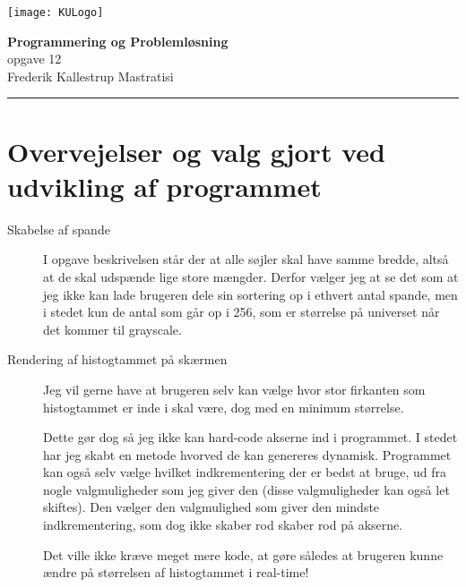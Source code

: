 \documentclass[12pt, a4paper, hidelinks]{article}
\begin{document}
\begin{minipage}[b]{1.0\linewidth}
\texttt{[image: KULogo]}

\vspace*{-16ex}
\begin{center}
    {\Large \bf Programmering og Problemløsning} \vspace*{1ex} \\
    {\large opgave 12} \vspace*{1ex} \\
    {\large Frederik Kallestrup Mastratisi}
\end{center}
\vspace*{-3pt}
{\color{KU-red}\hrule}
\end{minipage}
\vspace{2ex}

\tableofcontents \newpage

\section{Overvejelser og valg gjort ved udvikling af programmet}
\begin{description} 

\item[Skabelse af spande]
  I opgave beskrivelsen står der at alle søjler skal have samme bredde, altså at de skal udspænde lige store mængder. Derfor vælger jeg at se det som at jeg ikke kan lade brugeren dele sin sortering op i ethvert antal spande, men i stedet kun de antal som går op i 256, som er størrelse på universet når det kommer til grayscale.

\item[Rendering af histogtammet på skærmen]
Jeg vil gerne have at brugeren selv kan vælge hvor stor firkanten som histogtammet er inde i skal være, dog med en minimum størrelse.

Dette gør dog så jeg ikke kan hard-code akserne ind i programmet. I stedet har jeg skabt en metode hvorved de kan genereres dynamisk. Programmet kan også selv vælge hvilket indkrementering der er bedst at bruge, ud fra nogle valgmuligheder som jeg giver den (disse valgmuligheder kan også let skiftes). Den vælger den valgmulighed som giver den mindste indkrementering, som dog ikke skaber rod skaber rod på akserne.

Det ville ikke kræve meget mere kode, at gøre således at brugeren kunne ændre på størrelsen af histogtammet i real-time!



\end{description}
\end{document}
